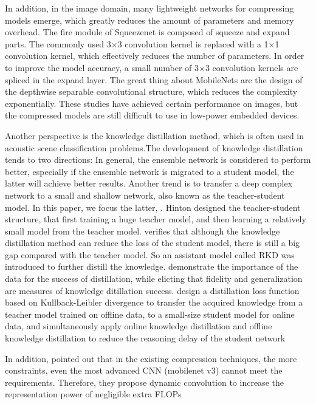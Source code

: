 \documentclass[conference]{IEEEtran}
\begin{document}
	In addition, in the image domain, many lightweight networks for compressing
	models emerge, which greatly reduces the amount of parameters and memory
	overhead. The fire module of Squeezenet\cite{iandola2016squeezenet} is composed
	of squeeze and expand parts. The commonly used 3×3 convolution kernel is
	replaced with a 1×1 convolution kernel, which effectively reduces the number of
	parameters. In order to improve the model accuracy, a small number of 3×3
	convolution kernels are spliced in the expand layer. The great thing about
	MobileNets\cite{howard2017mobilenets}\cite{sandler2019mobilenetv2}\cite{howard2019searching}
	are the design of the depthwise separable convolutional structure, which reduces
	the complexity exponentially. These studies have achieved certain performance on
	images, but the compressed models are still difficult to use in low-power
	embedded devices.
	
	Another perspective is the knowledge distillation method, which is often used in
	acoustic scene classification problems\cite{9186616}.The development of
	knowledge distillation tends to two directions: In general, the ensemble network
	is considered to perform better, especially if the ensemble network is migrated
	to a student model, the latter will achieve better
	results\cite{DBLP:journals/corr/abs-2012-09816}. Another trend is to transfer a
	deep complex network to a small and shallow network, also known as the
	teacher-student model. In this paper, we focus the latter,    .
	Hinton\cite{hinton2015distilling} designed the teacher-student structure, that
	first training a huge teacher model, and then learning a relatively small model
	from the teacher model. \cite{GAO2021154} verifies that although the knowledge
	distillation method can reduce the loss of the student model, there is still a
	big gap compared with the teacher model. So an assistant model called RKD was
	introduced to further distill the knowledge.\cite{stanton2021does} demonstrate the importance of the data for the success of distillation, while elicting that fidelity and generalization are measures of knowledge ditillation success.\cite{RN214} design a distillation loss function based on
	Kullback-Leibler divergence to transfer the acquired knowledge
	from a teacher model trained on offline data, to a small-size
	student model for online data, and simultaneously apply online knowledge distillation and offline knowledge distillation to reduce the reasoning delay of the student network
	
	In addition, \cite{9157588} pointed out that in the existing compression techniques, the more constraints, even the most advanced CNN (mobilenet v3) cannot meet the requirements. Therefore, they propose dynamic convolution to increase the representation power of negligible extra FLOPs
\end{document}
